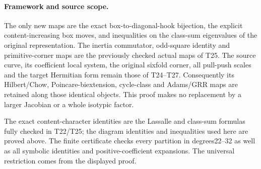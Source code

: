 \paragraph{Framework and source scope.}
The only new maps are the exact box-to-diagonal-hook
bijection, the explicit content-increasing box moves,
and inequalities on the class-sum eigenvalues of the
original representation. The inertia commutator,
odd-square identity and primitive-corner maps are
the previously checked actual maps of T25.
The source curve, its coefficient local system,
the original sixfold corner, all pull-push scales
and the target Hermitian form remain those of
T24--T27. Consequently its Hilbert/Chow,
Poincare-biextension, cycle-class and Adams/GRR
maps are retained along those identical objects.
This proof makes no replacement by a larger
Jacobian or a whole isotypic factor.

The exact content-character identities are the
Lassalle and class-sum formulas fully checked in
T22/T25; the diagram identities and inequalities
used here are proved above. The finite certificate
checks every partition in degrees22--32 as well
as all symbolic identities and positive-coefficient
expansions. The universal restriction comes from
the displayed proof.
